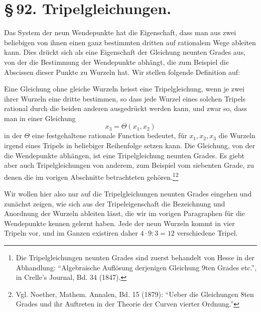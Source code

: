 \documentclass[11pt]{article}
\begin{document}
\section*{\S\,92. Tripelgleichungen.}

Das System der neun Wendepunkte hat die Eigenschaft, dass man aus zwei beliebigen von ihnen einen ganz bestimmten dritten auf rationalem Wege ableiten kann. Dies drückt sich als eine Eigenschaft der Gleichung neunten Grades aus, von der die Bestimmung der Wendepunkte abhängt, die zum Beispiel die Abscissen dieser Punkte zu Wurzeln hat. Wir stellen folgende Definition auf:

Eine Gleichung ohne gleiche Wurzeln heisst eine Tripelgleichung, wenn je zwei ihrer Wurzeln eine dritte bestimmen, so dass jede Wurzel eines solchen Tripels rational durch die beiden anderen ausgedrückt werden kann, und zwar so, dass man in einer Gleichung
\begin{equation}
 x_3=\Theta(x_1,x_2)
 \tag{1}
\end{equation}
in der \(\Theta\) eine festgehaltene rationale Function bedeutet, für \(x_1,x_2,x_3\) die Wurzeln irgend eines Tripels in beliebiger Reihenfolge setzen kann. Die Gleichung, von der die Wendepunkte abhängen, ist eine Tripelgleichung neunten Grades. Es giebt aber auch Tripelgleichungen von anderem, zum Beispiel vom siebenten Grade, zu denen die im vorigen Abschnitte betrachteten gehören.\footnote{Die Tripelgleichungen neunten Grades sind zuerst behandelt von Hesse in der Abhandlung: ``Algebraische Auflösung derjenigen Gleichung 9ten Grades etc.'', in Crelle's Journal, Bd. 34 (1847).}\footnote{Vgl. Noether, Mathem. Annalen, Bd. 15 (1879): ``Ueber die Gleichungen 8ten Grades und ihr Auftreten in der Theorie der Curven vierter Ordnung.''}

Wir wollen hier also nur auf die Tripelgleichungen neunten Grades eingehen und zunächst zeigen, wie sich aus der Tripeleigenschaft die Bezeichnung und Anordnung der Wurzeln ableiten lässt, die wir im vorigen Paragraphen für die Wendepunkte kennen gelernt haben. Jede der neun Wurzeln kommt in vier Tripeln vor, und im Ganzen existiren daher \(4\cdot 9:3=12\) verschiedene Tripel.
\end{document}
